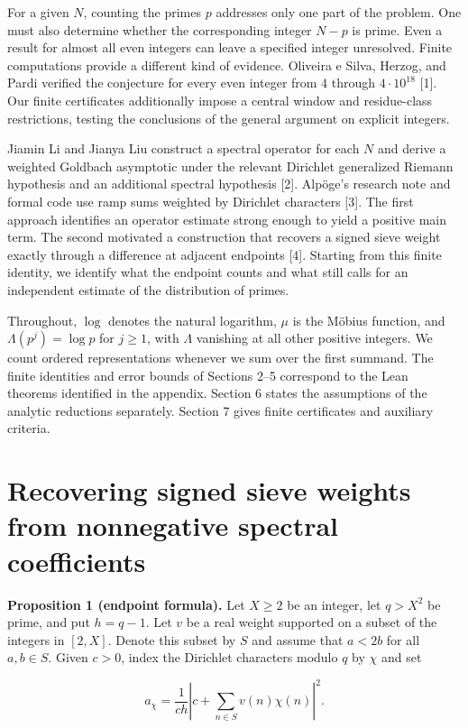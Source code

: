 \documentclass[11pt,a4paper]{article}
\begin{document}
For a given $N$, counting the primes $p$ addresses only one part of the problem. One must also determine whether the corresponding integer $N-p$ is prime. Even a result for almost all even integers can leave a specified integer unresolved. Finite computations provide a different kind of evidence. Oliveira e Silva, Herzog, and Pardi verified the conjecture for every even integer from 4 through $4\cdot10^{18}$ [1]. Our finite certificates additionally impose a central window and residue-class restrictions, testing the conclusions of the general argument on explicit integers.

Jiamin Li and Jianya Liu construct a spectral operator for each $N$ and derive a weighted Goldbach asymptotic under the relevant Dirichlet generalized Riemann hypothesis and an additional spectral hypothesis [2]. Alpöge's research note and formal code use ramp sums weighted by Dirichlet characters [3]. The first approach identifies an operator estimate strong enough to yield a positive main term. The second motivated a construction that recovers a signed sieve weight exactly through a difference at adjacent endpoints [4]. Starting from this finite identity, we identify what the endpoint counts and what still calls for an independent estimate of the distribution of primes.

Throughout, $\log$ denotes the natural logarithm, $\mu$ is the Möbius function, and $\Lambda(p^j)=\log p$ for $j\ge1$, with $\Lambda$ vanishing at all other positive integers. We count ordered representations whenever we sum over the first summand. The finite identities and error bounds of Sections 2--5 correspond to the Lean theorems identified in the appendix. Section 6 states the assumptions of the analytic reductions separately. Section 7 gives finite certificates and auxiliary criteria.

\section{Recovering signed sieve weights from nonnegative spectral coefficients}

\textbf{Proposition 1 (endpoint formula).} Let $X\ge2$ be an integer, let $q>X^2$ be prime, and put $h=q-1$. Let $v$ be a real weight supported on a subset of the integers in $[2,X]$. Denote this subset by $S$ and assume that $a<2b$ for all $a,b\in S$. Given $c>0$, index the Dirichlet characters modulo $q$ by $\chi$ and set

\[
a_\chi=\frac{1}{ch}\left|c+\sum_{n\in S}v(n)\chi(n)\right|^2.
\]
\end{document}
